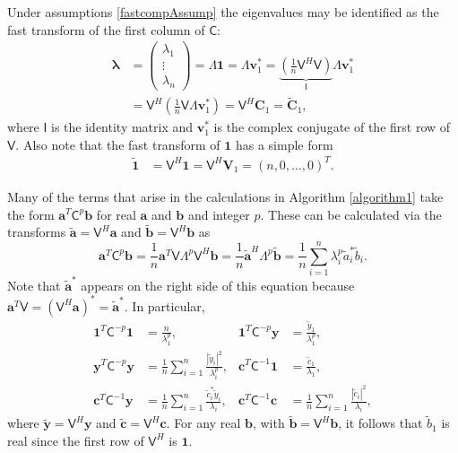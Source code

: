 \documentclass[twocolumn]{svjour3}          %
\newcommand{\bm}[1]{\boldsymbol{#1}}
\newcommand{\vlambda}{{\bm{\lambda}}}
\newcommand{\va}{\bm{a}}
\newcommand{\vb}{\bm{b}}
\newcommand{\vc}{\bm{c}}
\newcommand{\vC}{\bm{C}}
\newcommand{\vv}{\bm{v}}
\newcommand{\vV}{\bm{V}}
\newcommand{\vy}{\bm{y}}
\newcommand{\vone}{\bm{1}}
\newcommand{\mC}{\mathsf{C}}
\newcommand{\mCInv}{\mathsf{C}^{-1}}
\newcommand{\mLambda}{\mathsf{\Lambda}}
\newcommand{\mV}{\mathsf{V}}
\def\abs#1{\ensuremath{\left \lvert #1 \right \rvert}}
\begin{document}
Under assumptions \eqref{fastcompAssump} the eigenvalues may be identified as the fast transform of the first column of $\mC$:
\begin{align}
\nonumber
\vlambda 
& = \begin{pmatrix}
\lambda_1 \\ \vdots \\ \lambda_n
\end{pmatrix} = \mLambda \vone = \mLambda \vv_1^* 
= \underbrace{\left( \frac 1n \mV^H  \mV \right) }_{\mathsf{I}} \mLambda \vv_1^* \\
&= \mV^H \left( \frac 1n \mV \mLambda \vv_1^* \right)
= \mV^H \vC_1 =  \widetilde{\vC}_1,
\label{eqn:fast_transform_to_eigvalues}
\end{align}
where $\mathsf{I}$ is the identity matrix and $\vv_1^*$ is the complex conjugate of the first row of $\mV$.
Also note that the fast transform of $\vone$ has a simple form
\begin{align*} 
\widetilde{\vone}
& = \mV^H \vone = \mV^H \vV_1 = 
\left(n, 0, \dots, 0 \right)^T.
\label{eqn:fast_transform_one}
\end{align*}

Many of the terms that arise in the calculations in  Algorithm \ref{algorithm1} take the form $\va^T\mC^{p}\vb$ for real $\va$ and $\vb$ and integer $p$.  These can be calculated via the transforms $\widetilde{\va} = \mV^H \va$ and $\widetilde{\vb} = \mV^H \vb$ as 
\begin{equation*}
\va^T\mC^p\vb = \frac 1n \va^T \mV \mLambda^p \mV^H \vb
= \frac 1n \widetilde{\va}^H\mLambda^p \widetilde{\vb}
= \frac 1n \sum_{i=1}^n \lambda_i^p \widetilde{a}_i^* \widetilde{b}_i.
\end{equation*}
Note that $\widetilde{\va}^*$ appears on the right side of this equation because $\va^T \mV = (\mV^H \va)^* = \widetilde{\va}^*$.  In particular,
\begin{align*}
\vone^T\mC^{-p}\vone & = \frac{n}{\lambda_1^p},
&
\vone^T\mC^{-p}\vy &= \frac{\widetilde{y}_1}{\lambda_1^p},
\\
\vy^T\mC^{-p} \vy &= \frac 1n \sum_{i=1}^n \frac{\abs{\widetilde{y}_i}^2}{\lambda_i^p},
&
\vc^T\mCInv \vone &= \frac{\widetilde{c}_1}{\lambda_1},\\
\vc^T\mCInv \vy &= \frac 1n \sum_{i=1}^n \frac{\widetilde{c}_i^* \widetilde{y}_i}{\lambda_i}, & 
\vc^T\mCInv \vc &= \frac 1n \sum_{i=1}^n \frac{\abs{\widetilde{c}_i}^2}{\lambda_i},
\end{align*}
where $\widetilde{\vy} = \mV^H \vy$ and 
$\widetilde{\vc} = \mV^H \vc$.  For any real $\vb$, with $\widetilde{\vb} = \mV^H\vb$, it follows that $\widetilde{b}_1$ is real since the first row of $\mV^H$ is $\vone$.
\end{document}
